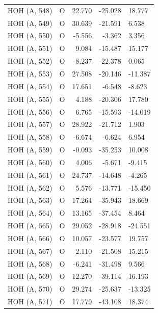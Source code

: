 \begin{longtable}{@{}lcrr@{}}
  \cmidrule(r){1-5}
  HOH (A, 548) & O & 22.770 & -25.028 & 18.777 \\
  \cmidrule(r){1-5}
  HOH (A, 549) & O & 30.639 & -21.591 & 6.538 \\
  \cmidrule(r){1-5}
  HOH (A, 550) & O & -5.556 & -3.362 & 3.356 \\
  \cmidrule(r){1-5}
  HOH (A, 551) & O & 9.084 & -15.487 & 15.177 \\
  \cmidrule(r){1-5}
  HOH (A, 552) & O & -8.237 & -22.378 & 0.065 \\
  \cmidrule(r){1-5}
  HOH (A, 553) & O & 27.508 & -20.146 & -11.387 \\
  \cmidrule(r){1-5}
  HOH (A, 554) & O & 17.651 & -6.548 & -8.623 \\
  \cmidrule(r){1-5}
  HOH (A, 555) & O & 4.188 & -20.306 & 17.780 \\
  \cmidrule(r){1-5}
  HOH (A, 556) & O & 6.765 & -15.593 & -14.019 \\
  \cmidrule(r){1-5}
  HOH (A, 557) & O & 28.922 & -21.712 & 1.903 \\
  \cmidrule(r){1-5}
  HOH (A, 558) & O & -6.674 & -6.624 & 6.954 \\
  \cmidrule(r){1-5}
  HOH (A, 559) & O & -0.093 & -35.253 & 10.008 \\
  \cmidrule(r){1-5}
  HOH (A, 560) & O & 4.006 & -5.671 & -9.415 \\
  \cmidrule(r){1-5}
  HOH (A, 561) & O & 24.737 & -14.648 & -4.265 \\
  \cmidrule(r){1-5}
  HOH (A, 562) & O & 5.576 & -13.771 & -15.450 \\
  \cmidrule(r){1-5}
  HOH (A, 563) & O & 17.264 & -35.943 & 18.669 \\
  \cmidrule(r){1-5}
  HOH (A, 564) & O & 13.165 & -37.454 & 8.464 \\
  \cmidrule(r){1-5}
  HOH (A, 565) & O & 29.052 & -28.918 & -24.551 \\
  \cmidrule(r){1-5}
  HOH (A, 566) & O & 10.057 & -23.577 & 19.757 \\
  \cmidrule(r){1-5}
  HOH (A, 567) & O & 2.110 & -21.508 & 15.215 \\
  \cmidrule(r){1-5}
  HOH (A, 568) & O & -6.241 & -31.498 & 9.566 \\
  \cmidrule(r){1-5}
  HOH (A, 569) & O & 12.270 & -39.114 & 16.193 \\
  \cmidrule(r){1-5}
  HOH (A, 570) & O & 29.274 & -25.637 & -13.325 \\
  \cmidrule(r){1-5}
  HOH (A, 571) & O & 17.779 & -43.108 & 18.374 \\

\end{longtable}
